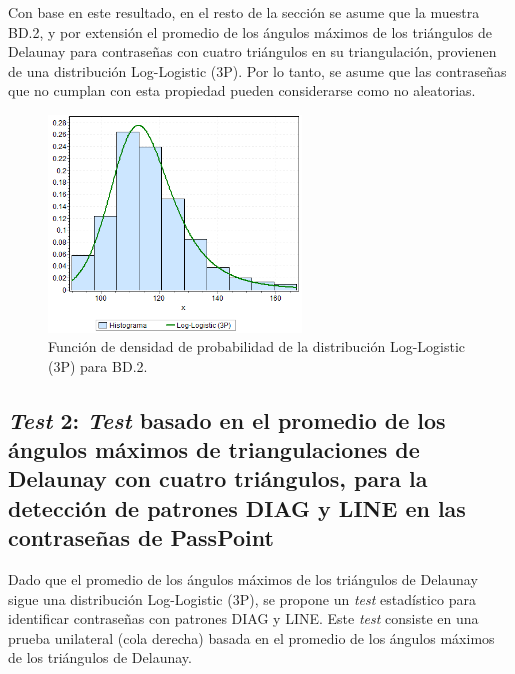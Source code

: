 \documentclass[12pt]{report}
\begin{document}
Con base en este resultado, en el resto de la sección se asume que la muestra BD.2, y por extensión el promedio de los ángulos máximos de los triángulos de Delaunay para contraseñas con cuatro triángulos en su triangulación, provienen de una distribución Log-Logistic (3P). Por lo tanto, se asume que las contraseñas que no cumplan con esta propiedad pueden considerarse como no aleatorias.
 
\begin{figure}[htbp]
	\centering
	
	\includegraphics[width=0.6\textwidth]{4td_fdp.png}
	\caption{Función de densidad de probabilidad de la  distribución Log-Logistic (3P) para BD.2.}
	\label{4TD_FDP}
\end{figure}
\newpage

\subsection{\textit{Test} 2: \textit{Test} basado en el promedio de los ángulos máximos de triangulaciones de Delaunay con cuatro triángulos, para la detección de patrones DIAG y LINE en las contraseñas de PassPoint}
\label{sec:2.2}

Dado que el promedio de los ángulos máximos de los triángulos de Delaunay sigue una distribución Log-Logistic (3P), se propone un \textit{test} estadístico para identificar contraseñas con patrones DIAG y LINE. Este \textit{test} consiste en una prueba unilateral (cola derecha) basada en el promedio de los ángulos máximos de los triángulos de Delaunay.
\end{document}
